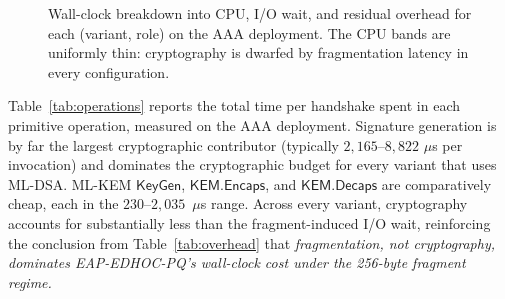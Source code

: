 \documentclass{easychair}
\newcommand{\KemKeyGen}{\mathsf{KeyGen}}
\newcommand{\Encaps}{\mathsf{KEM.Encaps}}
\newcommand{\Decaps}{\mathsf{KEM.Decaps}}
\begin{document}
\begin{figure}[H]
\centering
{}
\caption{Wall-clock breakdown into CPU, I/O wait, and residual
overhead for each (variant, role) on the AAA deployment. The CPU
bands are uniformly thin: cryptography is dwarfed by fragmentation
latency in every configuration.}
\label{fig:overhead-stacked}
\end{figure}
\FloatBarrier
Table~\ref{tab:operations} reports the total time per handshake spent
in each primitive operation, measured on the AAA deployment.
Signature generation is by far the largest cryptographic contributor
(typically $2{,}165$--$8{,}822$ $\mu$s per invocation) and dominates
the cryptographic budget for every variant that uses ML-DSA. ML-KEM
$\KemKeyGen$, $\Encaps$, and $\Decaps$ are comparatively cheap, each
in the $230$--$2{,}035$~$\mu$s range. Across every variant,
cryptography accounts for substantially less than the fragment-induced
I/O wait, reinforcing the conclusion from Table~\ref{tab:overhead}
that \emph{fragmentation, not cryptography, dominates EAP-EDHOC-PQ's
wall-clock cost under the 256-byte fragment regime.}
\end{document}
